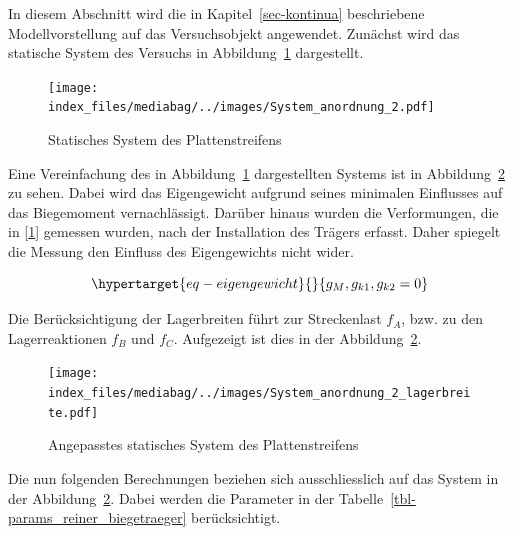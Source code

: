 \documentclass[
  12pt,
  letterpaper,
  egregdoesnotlikesansseriftitles]{scrreprt}
\begin{document}
In diesem Abschnitt wird die in Kapitel~\ref{sec-kontinua} beschriebene
Modellvorstellung auf das Versuchsobjekt angewendet. Zunächst wird das
statische System des Versuchs in Abbildung~\ref{fig-system_2}
dargestellt.

\begin{figure}[H]

{\centering \texttt{[image: index\_files/mediabag/../images/System\_anordnung\_2.pdf]}

}

\caption{\label{fig-system_2}Statisches System des Plattenstreifens}

\end{figure}

Eine Vereinfachung des in Abbildung~\ref{fig-system_2} dargestellten
Systems ist in Abbildung~\ref{fig-system_2_lager} zu sehen. Dabei wird
das Eigengewicht aufgrund seines minimalen Einflusses auf das
Biegemoment vernachlässigt. Darüber hinaus wurden die Verformungen, die
in {[}\protect\hyperlink{ref-Jaeger2006}{1}{]} gemessen wurden, nach der
Installation des Trägers erfasst. Daher spiegelt die Messung den
Einfluss des Eigengewichts nicht wider.

\begin{equation}\protect\hypertarget{eq-eigengewicht}{}{
g_M, g_{k1}, g_{k2} = 0
}\label{eq-eigengewicht}\end{equation}

Die Berücksichtigung der Lagerbreiten führt zur Streckenlast \(f_A\),
bzw. zu den Lagerreaktionen \(f_B\) und \(f_C\). Aufgezeigt ist dies in
der Abbildung~\ref{fig-system_2_lager}.

\begin{figure}[H]

{\centering \texttt{[image: index\_files/mediabag/../images/System\_anordnung\_2\_lagerbreite.pdf]}

}

\caption{\label{fig-system_2_lager}Angepasstes statisches System des
Plattenstreifens}

\end{figure}

Die nun folgenden Berechnungen beziehen sich ausschliesslich auf das
System in der Abbildung~\ref{fig-system_2_lager}. Dabei werden die
Parameter in der Tabelle~\ref{tbl-params_reiner_biegetraeger}
berücksichtigt.
\end{document}
